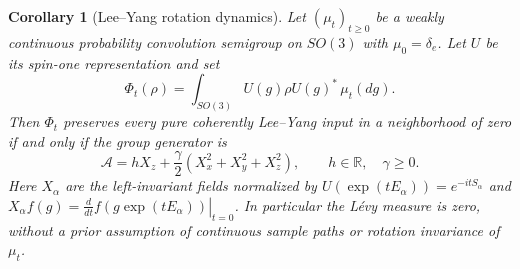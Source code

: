 \documentclass[reqno]{amsart}
\newtheorem{corollary}[theorem]{Corollary}
\theoremstyle{definition}
\theoremstyle{remark}
\newcommand{\R}{\mathbb R}
\begin{document}
\begin{corollary}[Lee--Yang rotation dynamics]\label{dyn:brownian-recognition}
Let $(\mu_t)_{t\geq0}$ be a weakly continuous probability convolution
semigroup on $SO(3)$ with $\mu_0=\delta_e$.  Let $U$ be its spin-one
representation and set
\[
 \Phi_t(\rho)=\int_{SO(3)}U(g)\rho U(g)^*\,\mu_t(dg).
\]
Then $\Phi_t$ preserves every pure coherently Lee--Yang input in a
neighborhood of zero if and only if the group generator is
\begin{equation}\label{dynspin:group-generator}
 \mathcal A=hX_z+\frac\gamma2(X_x^2+X_y^2+X_z^2),
 \qquad h\in\R,\quad\gamma\geq0.
\end{equation}
Here $X_\alpha$ are the left-invariant fields normalized by
$U(\exp(tE_\alpha))=e^{-itS_\alpha}$ and
$X_\alpha f(g)=\left.\frac{d}{dt}f(g\exp(tE_\alpha))\right|_{t=0}$.
In particular the L\'evy measure is zero, without a prior assumption of
continuous sample paths or rotation invariance of $\mu_t$.
\end{corollary}
\end{document}
